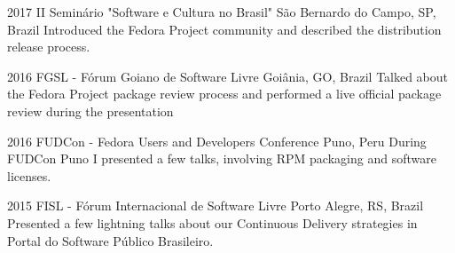 \documentclass[print]{friggeri-cv}
\begin{document}
\begin{entrylist}


\entry
{2017}
{II Seminário "Software e Cultura no Brasil"}
{São Bernardo do Campo, SP, Brazil}
{Introduced the Fedora Project community and described the distribution release process.}


\entry
{2016}
{FGSL - Fórum Goiano de Software Livre}
{Goiânia, GO, Brazil}
{Talked about the Fedora Project package review process and performed a live official package review during the presentation}

\entry
{2016}
{FUDCon - Fedora Users and Developers Conference}
{Puno, Peru}
{During FUDCon Puno I presented a few talks, involving RPM packaging and software licenses.}


\entry
{2015}
{FISL - Fórum Internacional de Software Livre}
{Porto Alegre, RS, Brazil}
{Presented a few lightning talks about our Continuous Delivery strategies in
  Portal do Software Público Brasileiro.}


\end{entrylist}







\end{document}
